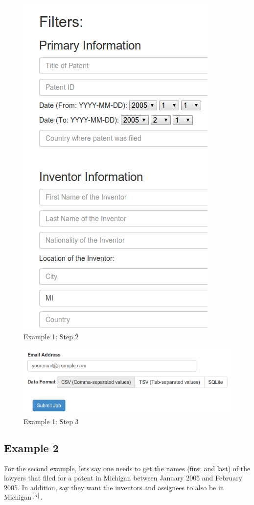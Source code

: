 \begin{figure}
\center
\includegraphics[width=.8\textwidth]{figs/ex1s2}
\caption{Example 1: Step 2}
\label{fig:Step 2}
\end{figure}

\begin{figure}
\center
\includegraphics[width=.8\textwidth]{figs/ex1s3}
\caption{Example 1: Step 3}
\label{fig:Step 3}
\end{figure}


\subsection{Example 2}
For the second example, lets say one needs to get the names (first and last) of the lawyers that filed for a patent in Michigan between January 2005 and February 2005. In addition, say they want the inventors and assignees to also be in Michigan$^{[5]}$.

